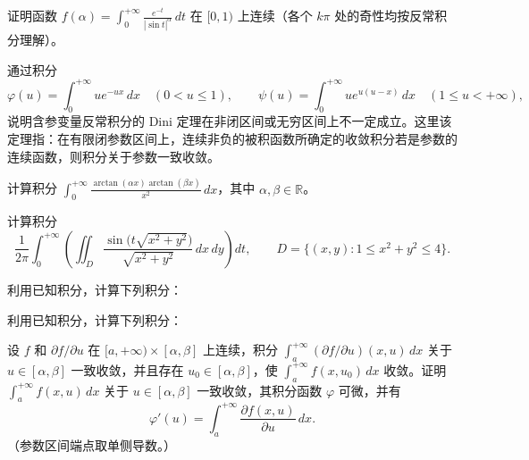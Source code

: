 \noindent\begin{minipage}{\textwidth}
证明函数 $\displaystyle f(\alpha)=\int_0^{+\infty}\frac{e^{-t}}{|\sin t|^\alpha}\,dt$ 在 $[0,1)$ 上连续（各个 $k\pi$ 处的奇性均按反常积分理解）。
\end{minipage}\par\vfill
\newpage
\noindent\begin{minipage}{\textwidth}
通过积分\[\varphi(u)=\int_0^{+\infty}ue^{-ux}\,dx\quad(0<u\le1),\qquad\psi(u)=\int_0^{+\infty}ue^{u(u-x)}\,dx\quad(1\le u<+\infty),\]说明含参变量反常积分的 Dini 定理在非闭区间或无穷区间上不一定成立。这里该定理指：在有限闭参数区间上，连续非负的被积函数所确定的收敛积分若是参数的连续函数，则积分关于参数一致收敛。
\end{minipage}\par\vfill
\noindent\begin{minipage}{\textwidth}
计算积分 $\displaystyle\int_0^{+\infty}\frac{\arctan(\alpha x)\arctan(\beta x)}{x^2}\,dx$，其中 $\alpha,\beta\in\mathbb R$。
\end{minipage}\par\vfill
\noindent\begin{minipage}{\textwidth}
计算积分\[\frac1{2\pi}\int_0^{+\infty}\left(\iint_D\frac{\sin\bigl(t\sqrt{x^2+y^2}\bigr)}{\sqrt{x^2+y^2}}\,dx\,dy\right)dt,\qquad D=\{(x,y):1\le x^2+y^2\le4\}.\]
\end{minipage}\par\vfill
\newpage
\noindent\begin{minipage}{\textwidth}
利用已知积分，计算下列积分：
\end{minipage}\par\vfill
\noindent\begin{minipage}{\textwidth}
利用已知积分，计算下列积分：
\end{minipage}\par\vfill
\noindent\begin{minipage}{\textwidth}
设 $f$ 和 $\partial f/\partial u$ 在 $[a,+\infty)\times[\alpha,\beta]$ 上连续，积分 $\int_a^{+\infty}(\partial f/\partial u)(x,u)\,dx$ 关于 $u\in[\alpha,\beta]$ 一致收敛，并且存在 $u_0\in[\alpha,\beta]$，使 $\int_a^{+\infty}f(x,u_0)\,dx$ 收敛。证明 $\int_a^{+\infty}f(x,u)\,dx$ 关于 $u\in[\alpha,\beta]$ 一致收敛，其积分函数 $\varphi$ 可微，并有\[\varphi'(u)=\int_a^{+\infty}\frac{\partial f(x,u)}{\partial u}\,dx.\]（参数区间端点取单侧导数。）
\end{minipage}\par\vfill
